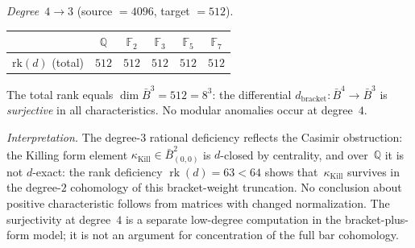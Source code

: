\begin{computation}
\emph{Degree~$4 \to 3$} (source $= 4096$, target $= 512$).
\begin{center}
\renewcommand{\arraystretch}{1.2}
\begin{tabular}{c|ccccc}
& $\mathbb{Q}$ & $\mathbb{F}_2$ & $\mathbb{F}_3$ &
$\mathbb{F}_5$ & $\mathbb{F}_7$ \\
\hline
$\mathrm{rk}(d)$ (total) & $512$ & $512$ & $512$ & $512$ & $512$
\end{tabular}
\end{center}
The total rank equals $\dim \bar{B}^3 = 512 = 8^3$: the differential
$d_{\mathrm{bracket}}\colon \bar{B}^4 \to \bar{B}^3$ is
\emph{surjective} in all characteristics. No modular anomalies
occur at degree~$4$.

\emph{Interpretation.} The degree-$3$ rational deficiency reflects the
Casimir obstruction: the Killing form element
$\kappa_{\mathrm{Kill}} \in \bar{B}^2_{(0,0)}$ is $d$-closed by centrality,
and over~$\mathbb{Q}$ it is not $d$-exact: the rank deficiency
$\operatorname{rk}(d) = 63 < 64$ shows that~$\kappa_{\mathrm{Kill}}$
survives in the degree-$2$ cohomology of this bracket-weight
truncation.
No conclusion about positive characteristic follows from matrices with
changed normalization. The surjectivity at degree~$4$ is a separate
low-degree computation in the bracket-plus-form model; it is not an
argument for concentration of the full bar cohomology.
\end{computation}


